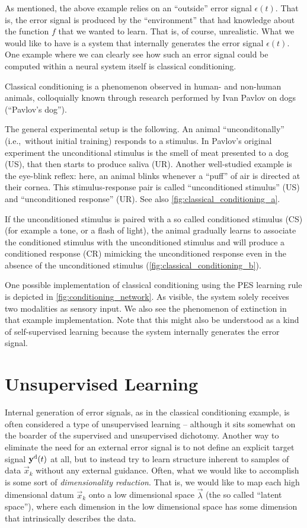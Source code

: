 \documentclass[10pt,letterpaper,oneside]{article}
\begin{document}
As mentioned, the above example relies on an \enquote{outside} error signal $\epsilon(t)$. That is, the error signal is produced by the \enquote{environment} that had knowledge about the function $f$ that we wanted to learn. That is, of course, unrealistic. What we would like to have is a system that internally generates the error signal $\epsilon(t)$. One example where we can clearly see how such an error signal could be computed within a neural system itself is classical conditioning.

Classical conditioning is a phenomenon observed in human- and non-human animals, colloquially known through research performed by Ivan Pavlov on dogs (\enquote{Pavlov's dog}).

The general experimental setup is the following. An animal \enquote{unconditonally} (i.e.,~without initial training) responds to a stimulus. In Pavlov's original experiment the unconditional stimulus is the smell of meat presented to a dog (US), that then starts to produce saliva (UR). Another well-studied example is the eye-blink reflex: here, an animal blinks whenever a \enquote{puff} of air is directed at their cornea. This stimulus-response pair is called \enquote{unconditioned stimulus} (US) and \enquote{unconditioned response} (UR). See also \cref{fig:classical_conditioning_a}.

If the unconditioned stimulus is paired with a so called conditioned stimulus (CS) (for example a tone, or a flash of light), the animal gradually learns to associate the conditioned stimulus with the unconditioned stimulus and will produce a conditioned response (CR) mimicking the unconditioned response even in the absence of the unconditioned stimulus (\cref{fig:classical_conditioning_b}).

One possible implementation of classical conditioning using the PES learning rule is depicted in \cref{fig:conditioning_network}. As visible, the system solely receives two modalities as sensory input. We also see the phenomenon of extinction in that example implementation. Note that this might also be understood as a kind of self-supervised learning because the system internally generates the error signal.

\section{Unsupervised Learning}

Internal generation of error signals, as in the classical conditioning example, is often considered a type of unsupervised learning -- although it sits somewhat on the boarder of the supervised and unsupervised dichotomy. Another way to eliminate the need for an external error signal is to not define an explicit target signal ${\mathbf{y}}^\mathrm{d}(t)$ at all, but to instead try to learn structure inherent to samples of data $\vec x_k$ without any external guidance. Often, what we would like to accomplish is some sort of \emph{dimensionality reduction}. That is, we would like to map each high dimensional datum $\vec x_k$ onto a low dimensional space $\vec \lambda$ (the so called \enquote{latent space}), where each dimension in the low dimensional space has some dimension that intrinsically describes the data.
\end{document}
